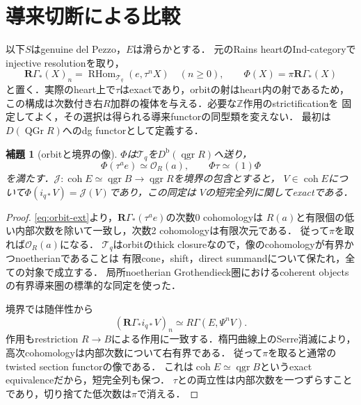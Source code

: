 \documentclass[11pt,a4paper]{ltjsarticle}
\newtheorem{lemma}[theorem]{補題}
\theoremstyle{definition}
\newcommand{\OO}{\mathcal O}
\newcommand{\TT}{\mathcal T}
\newcommand{\Db}{D^{\mathrm b}}
\newcommand{\RHom}{\operatorname{RHom}}
\newcommand{\coh}{\operatorname{coh}}
\newcommand{\qgr}{\operatorname{qgr}}
\newcommand{\QGr}{\operatorname{QGr}}
\begin{document}
\section{導来切断による比較}\label{sec:comparison}
以下$S$はgenuine del Pezzo，$E$は滑らかとする．
元のRains heartのInd-categoryでinjective resolutionを取り，
\begin{equation}\label{eq:derived-section}
 \mathbf R\Gamma_*(X)_n=\RHom_{\TT_q}(e,\tau^nX)\quad(n\geq0),
 \qquad \Phi(X)=\pi\mathbf R\Gamma_*(X)
\end{equation}
と置く．実際のheart上で$\tau$はexactであり，orbitの射はheart内の射であるため，
この構成は次数付き右$R$加群の複体を与える．必要な$\mathbb Z$作用のstrictificationを
固定してよく，その選択は得られる導来functorの同型類を変えない．
最初は$D(\QGr R)$へのdg functorとして定義する．

\begin{lemma}[orbitと境界の像]\label{lem:images}
$\Phi$は$\TT_q$を$\Db(\qgr R)$へ送り，
\[
 \Phi(\tau^ae)\simeq\OO_R(a),\qquad \Phi\tau\simeq(1)\Phi
\]
を満たす．$\mathcal J:\coh E\simeq\qgr B\to\qgr R$を境界の包含とすると，
$V\in\coh E$について$\Phi(i_{q*}V)=\mathcal J(V)$であり，この同定は
$V$の短完全列に関してexactである．
\end{lemma}
\begin{proof}
\eqref{eq:orbit-ext}より，$\mathbf R\Gamma_*(\tau^ae)$の次数0 cohomologyは
$R(a)$と有限個の低い内部次数を除いて一致し，次数2 cohomologyは有限次元である．
従って$\pi$を取れば$\OO_R(a)$になる．
$\TT_q$はorbitのthick closureなので，像のcohomologyが有界かつnoetherianであることは
有限cone，shift，direct summandについて保たれ，全ての対象で成立する．
局所noetherian Grothendieck圏におけるcoherent objectsの有界導来圏の標準的な同定を使った．

境界では随伴性から
\[
 (\mathbf R\Gamma_*i_{q*}V)_n\simeq R\Gamma(E,\Psi^nV).
\]
作用もrestriction $R\to B$による作用に一致する．楕円曲線上のSerre消滅により，
高次cohomologyは内部次数について右有界である．
従って$\pi$を取ると通常のtwisted section functorの像である．
これは$\coh E\simeq\qgr B$というexact equivalenceだから，短完全列も保つ．
$\tau$との両立性は内部次数を一つずらすことであり，切り捨てた低次数は$\pi$で消える．
\end{proof}
\end{document}
